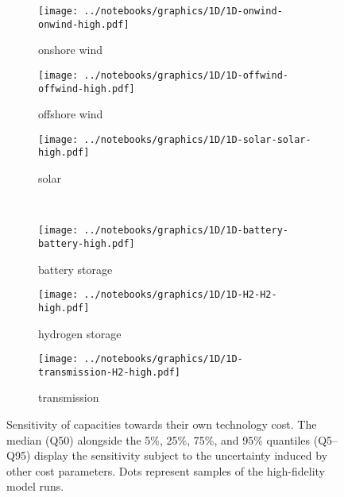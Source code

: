 \begin{figure}
    \begin{subfigure}[t]{0.32\textwidth}
        \caption{onshore wind}
        \texttt{[image: ../notebooks/graphics/1D/1D-onwind-onwind-high.pdf]}
    \end{subfigure}
    \begin{subfigure}[t]{0.32\textwidth}
        \caption{offshore wind}
        \texttt{[image: ../notebooks/graphics/1D/1D-offwind-offwind-high.pdf]}
    \end{subfigure}
    \begin{subfigure}[t]{0.32\textwidth}
        \caption{solar}
        \texttt{[image: ../notebooks/graphics/1D/1D-solar-solar-high.pdf]}
    \end{subfigure} \\
    \begin{subfigure}[t]{0.32\textwidth}
        \caption{battery storage}
        \texttt{[image: ../notebooks/graphics/1D/1D-battery-battery-high.pdf]}
    \end{subfigure}
    \begin{subfigure}[t]{0.32\textwidth}
        \caption{hydrogen storage}
        \texttt{[image: ../notebooks/graphics/1D/1D-H2-H2-high.pdf]}
    \end{subfigure}
    \begin{subfigure}[t]{0.32\textwidth}
        \caption{transmission}
        \texttt{[image: ../notebooks/graphics/1D/1D-transmission-H2-high.pdf]}
    \end{subfigure}
    \vspace{-0.3cm}
    \caption{
      Sensitivity of capacities towards their own technology cost.
      The median (Q50) alongside the 5\%, 25\%, 75\%, and 95\% quantiles (Q5--Q95) display
      the sensitivity subject to the uncertainty induced by other cost parameters.
      Dots represent samples of the high-fidelity model runs.
    }
    \label{fig:sensitivity}
\end{figure}

